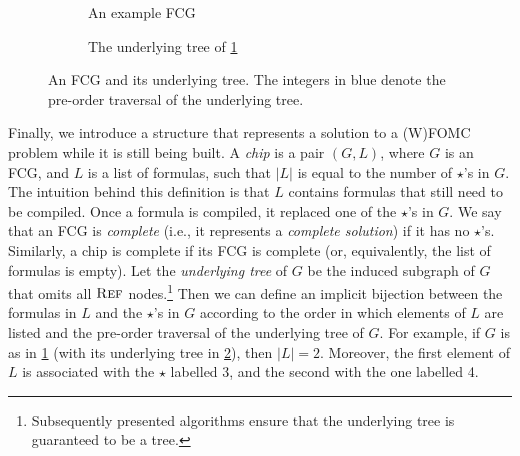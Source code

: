 \begin{figure}[t]
  \centering
  \begin{subfigure}{0.49\textwidth}
    \centering
    \caption{An example FCG}\label{fig:smallexample1}
  \end{subfigure}
  \begin{subfigure}{0.49\textwidth}
    \centering
    \caption{The underlying tree of
      \cref{fig:smallexample1}}\label{fig:smallexample2}
  \end{subfigure}
  \caption{An FCG and its underlying tree. The integers in blue denote the
    pre-order traversal of the underlying tree.}\label{fig:ordering}
\end{figure}

Finally, we introduce a structure that represents a solution to a (W)FOMC
problem while it is still being built. A \emph{chip} is a pair $(G, L)$, where
$G$ is an FCG, and $L$ is a list of formulas, such that $|L|$ is equal to the
number of $\star$'s in $G$. The intuition behind this definition is that $L$
contains formulas that still need to be compiled. Once a formula is compiled, it
replaced one of the $\star$'s in $G$. We say that an FCG is \emph{complete}
(i.e., it represents a \emph{complete solution}) if it has no $\star$'s.
Similarly, a chip is complete if its FCG is complete (or, equivalently, the list
of formulas is empty). Let the \emph{underlying tree} of $G$ be the induced
subgraph of $G$ that omits all $\operatorname{\textsc{Ref}}$ nodes.\footnote{Subsequently presented
  algorithms ensure that the underlying tree is guaranteed to be a tree.} Then
we can define an implicit bijection between the formulas in $L$ and the
$\star$'s in $G$ according to the order in which elements of $L$ are listed and
the pre-order traversal of the underlying tree of $G$. For example, if $G$ is as
in \cref{fig:smallexample1} (with its underlying tree in
\cref{fig:smallexample2}), then $|L| = 2$. Moreover, the first element of $L$ is
associated with the $\star$ labelled 3, and the second with the one labelled 4.

